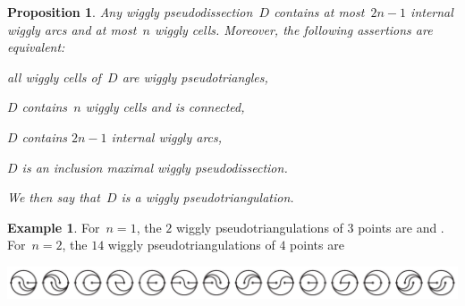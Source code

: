\documentclass[submission]{FPSAC2025}
\newtheorem{proposition}[theorem]{Proposition}
\theoremstyle{definition}
\newtheorem{example}[theorem]{Example}
\newcommand{\darkblue}{\color{darkblue}} %
\newcommand{\defn}[1]{\textsl{\darkblue #1}} %
\begin{document}
\begin{proposition}
\label{prop:wigglyPseudotriangulations}
Any wiggly pseudodissection~$D$ contains at most~$2n-1$ internal wiggly arcs and at most~$n$ wiggly cells.
Moreover, the following assertions are equivalent:
\begin{compactenum}[(i)]
\item all wiggly cells of~$D$ are wiggly pseudotriangles,
\item $D$ contains~$n$ wiggly cells and is connected,
\item $D$ contains $2n-1$ internal wiggly arcs,
\item $D$ is an inclusion maximal wiggly pseudodissection.
\end{compactenum}
We then say that~$D$ is a \defn{wiggly pseudotriangulation}.
\end{proposition}

\begin{example}
\label{exm:allSmallWigglyPseudotriangulations}
For~$n = 1$, the $2$ wiggly pseudotriangulations of $3$ points are  and .
For~${n = 2}$, the $14$ wiggly pseudotriangulations of $4$ points are \\[.2cm]
\centerline{\includegraphics[scale=.85]{wigglyPseudotriangulations}}
\end{example}
\end{document}
